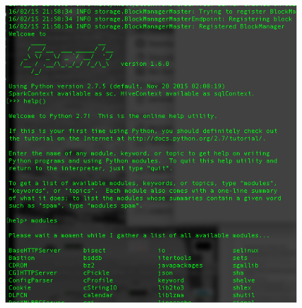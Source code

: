 \documentclass[10pt]{article}
\begin{document}
\begin{figure}[!h]
\includegraphics[scale=0.37]{pyspark.png}
\centering
\end{figure}\\
\end{document}
